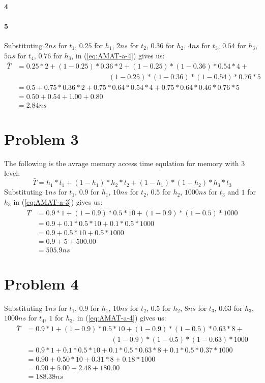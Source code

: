 \documentclass[11pt]{article}
\begin{document}
\paragraph{4}
\paragraph{5}
Substituting $2ns$ for $t_1$, $0.25$ for $h_1$, $2ns$ for $t_2$, $0.36$ for $h_2$, $4ns$ for $t_3$, $0.54$ for $h_3$,$5ns$ for $t_4$, $0.76$ for $h_3$,
in (\ref{eq:AMAT-a-4}) gives us:
\begin{align*}
	\bar{T} &= 0.25 * 2 + (1 - 0.25) * 0.36 * 2 + (1 - 0.25) * (1 - 0.36) * 0.54 * 4 + \\
	&\qquad \phantom{= 0.25 * 2 + (1 - 0.25)} (1 - 0.25) * (1 - 0.36) * (1 - 0.54) * 0.76 * 5 \\
	&= 0.5 + 0.75 * 0.36 * 2 + 0.75 * 0.64 * 0.54 * 4 + 0.75 * 0.64 * 0.46 * 0.76 * 5 \\
	&= 0.50 + 0.54 + 1.00 + 0.80 \\
	&= 2.84ns
\end{align*}
\section{Problem 3}
The following is the avrage memory access time equlation for
memory with 3 level:
\begin{equation}
	\label{eq:AMAT-a-3}
	\bar{T} = h_1 * t_1 + (1 - h_1) * h_2 * t_2 + (1 - h_1) * (1 - h_2) * h_3 * t_3
\end{equation}
Substituting $1ns$ for $t_1$, $0.9$ for $h_1$, $10ns$ for $t_2$, $0.5$ for $h_2$, $1000ns$ for $t_3$ and $1$ for $h_3$
in (\ref{eq:AMAT-a-3}) gives us:
\begin{align*}
	\bar{T} &= 0.9 * 1 + (1 - 0.9) * 0.5 * 10 + (1 - 0.9) * (1 - 0.5) * 1000\\
	&= 0.9 + 0.1 * 0.5 * 10 + 0.1 * 0.5 * 1000\\
	&= 0.9 + 0.5 * 10 + 0.5 * 1000\\
	&= 0.9 + 5 + 500.00\\
	&= 505.9ns
\end{align*}
\section{Problem 4}
Substituting $1ns$ for $t_1$, $0.9$ for $h_1$, $10ns$ for $t_2$, $0.5$ for $h_2$, $8ns$ for $t_3$, $0.63$ for $h_3$,$1000ns$ for $t_4$, $1$ for $h_3$,
in (\ref{eq:AMAT-a-4}) gives us:
\begin{align*}
	\bar{T} &= 0.9 * 1 + (1 - 0.9) * 0.5 * 10 + (1 - 0.9) * (1 - 0.5) * 0.63 * 8 + \\
	&\qquad \phantom{= 0.1 * 1 + (1 - 0.9)} (1 - 0.9) * (1 - 0.5) * (1 - 0.63) * 1000 \\
	&= 0.9 * 1 + 0.1 * 0.5 * 10 + 0.1 * 0.5 * 0.63 * 8 + 0.1 * 0.5 * 0.37 * 1000 \\
	&= 0.90 + 0.50 * 10 + 0.31 * 8 + 0.18 * 1000 \\
	&= 0.90 + 5.00 + 2.48 + 180.00 \\
	&= 188.38ns
\end{align*}
\end{document}
